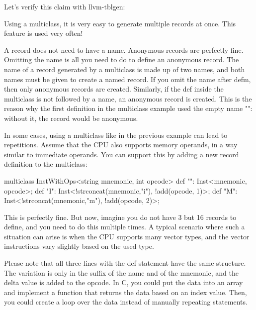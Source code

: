 Let’s verify this claim with llvm-tblgen:


Using a multiclass, it is very easy to generate multiple records at once. This feature is used very often!

A record does not need to have a name. Anonymous records are perfectly fine. Omitting the name is all you need to do to define an anonymous record. The name of a record generated by a multiclass is made up of two names, and both names must be given to create a named record. If you omit the name after defm, then only anonymous records are created. Similarly, if the def inside the multiclass is not followed by a name, an anonymous record is created. This is the reason why the first definition in the multiclass example used the empty name "": without it, the record would be anonymous.


In some cases, using a multiclass like in the previous example can lead to repetitions. Assume that the CPU also supports memory operands, in a way similar to immediate operands. You can support this by adding a new record definition to the multiclass:

\begin{shell}
multiclass InstWithOps<string mnemonic, int opcode> {
    def "": Inst<mnemonic, opcode>;
    def "I": Inst<!strconcat(mnemonic,"i"), !add(opcode, 1)>;
    def "M": Inst<!strconcat(mnemonic,"m"), !add(opcode, 2)>;
}
\end{shell}

This is perfectly fine. But now, imagine you do not have 3 but 16 records to define, and you need to do this multiple times. A typical scenario where such a situation can arise is when the CPU supports many vector types, and the vector instructions vary slightly based on the used type.

Please note that all three lines with the def statement have the same structure. The variation is only in the suffix of the name and of the mnemonic, and the delta value is added to the opcode. In C, you could put the data into an array and implement a function that returns the data based on an index value. Then, you could create a loop over the data instead of manually repeating statements.

